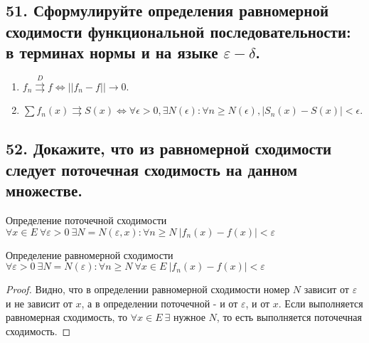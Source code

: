 \documentclass[a4paper, fleqn]{article}
\begin{document}
        
    \subsection*{51. Сформулируйте определения равномерной сходимости функциональной последовательности: в терминах нормы и на языке $\varepsilon - \delta$.}
    \begin{enumerate}
        \item $f_n \overset{D}{\rightrightarrows} f \iff ||f_n - f|| \rightarrow 0$. \\
      \item $\sum f_n(x) \rightrightarrows S(x) \iff \forall \epsilon > 0, \exists N(\epsilon): \forall n \geqslant N(\epsilon), |S_n(x) - S(x)| < \epsilon$. \\
    \end{enumerate}
        
        
        \subsection*{52. Докажите, что из равномерной сходимости следует поточечная сходимость на данном множестве.}
        Определение поточечной сходимости $\forall x \in E\ \forall \varepsilon > 0\ \exists N = N(\varepsilon, x) : \forall n \geqslant N\ |f_n(x) - f(x)| < \varepsilon$

        Определение равномерной сходимости $\forall \varepsilon > 0\ \exists N = N(\varepsilon) : \forall n \geqslant N\ \forall x \in E\ |f_n(x) - f(x)| < \varepsilon$
        \begin{proof}
        Видно, что в определении равномерной сходимости номер $N$ зависит от $\varepsilon$ и не зависит от $x$, а в определении поточечной - и от $\varepsilon$, и от $x$. Если выполняется равномерная сходимость, то $\forall x \in E\ \exists$ нужное $N$, то есть выполняется поточечная сходимость.
        \end{proof}
        
\end{document}
